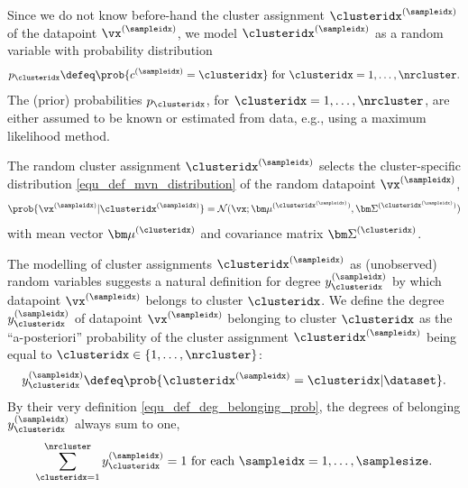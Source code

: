 \documentclass[12pt]{report}
\begin{document}
Since we do not know before-hand the cluster assignment $\clusteridx^{(\sampleidx)}$ 
of the datapoint $\vx^{(\sampleidx)}$, we model $\clusteridx^{(\sampleidx)}$ 
as a random variable with probability distribution  
\begin{equation} 
\label{equ_def_cluster_prob}
p_{\clusteridx} \defeq \prob{c^{(\sampleidx)}=\clusteridx} \mbox{ for } \clusteridx=1,\ldots,\nrcluster.
\end{equation}  
The (prior) probabilities $p_{\clusteridx}$, for $\clusteridx=1,\ldots,\nrcluster$, 
are either assumed to be known or estimated from data, e.g., using a maximum 
likelihood method. 

The random cluster assignment $\clusteridx^{(\sampleidx)}$ selects the cluster-specific 
distribution \eqref{equ_def_mvn_distribution} of the random datapoint $\vx^{(\sampleidx)}$, 
\begin{equation}
\label{equ_cond_dist_GMM}
 \prob{\vx^{(\sampleidx)} | \clusteridx^{(\sampleidx)} } = \mathcal{N} (\vx; {\bm \mu}^{(\clusteridx^{(\sampleidx)})}, {\bm \Sigma}^{(\clusteridx^{(\sampleidx)})})
\end{equation} 
with mean vector ${\bm \mu}^{(\clusteridx)}$ and covariance matrix ${\bm \Sigma}^{(\clusteridx)}$. 

The modelling of cluster assignments $\clusteridx^{(\sampleidx)}$ as 
(unobserved) random variables suggests a natural definition for degree 
$y^{(\sampleidx)}_{\clusteridx}$ by which datapoint $\vx^{(\sampleidx)}$ 
belongs to cluster $\clusteridx$. We define the degree $y^{(\sampleidx)}_{\clusteridx}$ 
of datapoint $\vx^{(\sampleidx)}$ belonging to cluster $\clusteridx$ as 
the ``a-posteriori'' probability of the cluster assignment $\clusteridx^{(\sampleidx)}$ 
being equal to $\clusteridx \in \{1,\ldots,\nrcluster\}$: 
\begin{equation}
\label{equ_def_deg_belonging_prob}
y^{(\sampleidx)}_{\clusteridx} \defeq \prob{ \clusteridx^{(\sampleidx)} = \clusteridx | \dataset}.
\end{equation} 
By their very definition \eqref{equ_def_deg_belonging_prob}, 
the degrees of belonging $y^{(\sampleidx)}_{\clusteridx}$ always 
sum to one, 
\begin{equation} 
\label{equ_dob_sum_to_one}
\sum_{\clusteridx=1}^{\nrcluster} y^{(\sampleidx)}_{\clusteridx}=1 \mbox{ for each } \sampleidx=1,\ldots,\samplesize.
\end{equation}  
\end{document}
